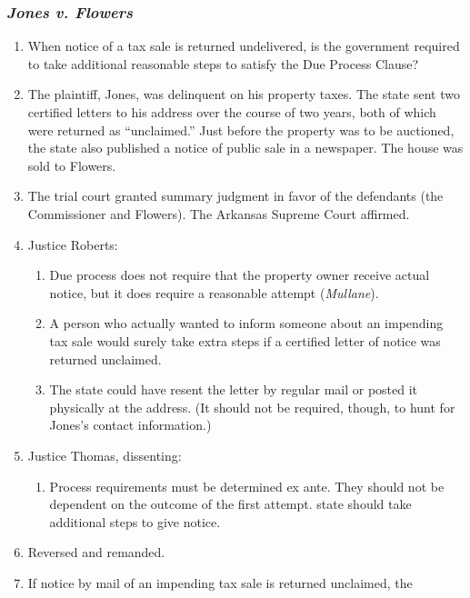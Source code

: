 \subsubsection{\emph{Jones v. Flowers}}

\begin{enumerate}
    \item When notice of a tax sale is returned undelivered, is the government
    required to take additional reasonable steps to satisfy the Due Process
    Clause?
    \item The plaintiff, Jones, was delinquent on his property taxes. The state
    sent two certified letters to his address over the course of two years,
    both of which were returned as ``unclaimed.'' Just before the property
    was to be auctioned, the state also published a notice of public sale in
    a newspaper. The house was sold to Flowers.
    \item The trial court granted summary judgment in favor of the defendants (the
    Commissioner and Flowers). The Arkansas Supreme Court affirmed.
    \item Justice Roberts:
    \begin{enumerate}
        \item Due process does not require that the property owner receive actual
          notice, but it does require a reasonable attempt (\emph{Mullane}).
        \item A person who actually wanted to inform someone about an impending tax
          sale would surely take extra steps if a certified letter of notice was
          returned unclaimed.
        \item The state could have resent the letter by regular mail or posted it
          physically at the address. (It should not be required, though, to hunt
          for Jones's contact information.)
    \end{enumerate}
    \item Justice Thomas, dissenting:
    \begin{enumerate}
        \item Process requirements must be determined ex ante. They should not be
          dependent on the outcome of the first attempt.
          state should take additional steps to give notice.
    \end{enumerate}
    \item Reversed and remanded.
    \item If notice by mail of an impending tax sale is returned unclaimed, the
\end{enumerate}

